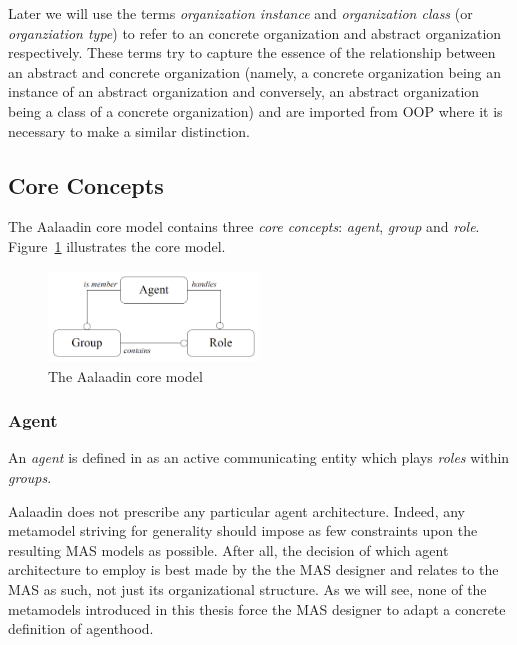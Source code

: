 Later we will use the terms \textit{organization instance} and \textit{organization class} (or \textit{organziation type}) to refer to an concrete organization and abstract organization respectively.
These terms try to capture the essence of the relationship between an abstract and concrete organization (namely, a concrete organization being an instance of an abstract organization and conversely, an abstract organization being a class of a concrete organization) and are imported from OOP where it is necessary to make a similar distinction. 

\subsection{Core Concepts}

The Aalaadin core model contains three \textit{core concepts}: \textit{agent}, \textit{group} and \textit{role}.
Figure~\ref{figure:aalaadin-core-model} illustrates the core model.

\begin{figure}[h]
	\centering
	\includegraphics[width=0.5\textwidth]{images/aalaadin/core-model.png}
	\caption{The Aalaadin core model}
	\label{figure:aalaadin-core-model}
\end{figure}

\subsubsection*{Agent}

An \textit{agent} is defined in \cite{Ferber97} as an active communicating entity which plays \textit{roles} within \textit{groups}.

Aalaadin does not prescribe any particular agent architecture.
Indeed, any metamodel striving for generality should impose as few constraints upon the resulting MAS models as possible.
After all, the decision of which agent architecture to employ is best made by the the MAS designer and relates to the MAS as such, not just its organizational structure.
As we will see, none of the metamodels introduced in this thesis force the MAS designer to adapt a concrete definition of agenthood.

